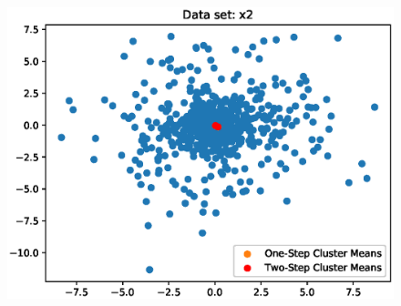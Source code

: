 \documentclass[UTF8]{article}
\begin{document}
\begin{figure}[H]
    \centering
    \includegraphics[scale=1.2]{./figures/x2.eps}
\end{figure}
\end{document}
